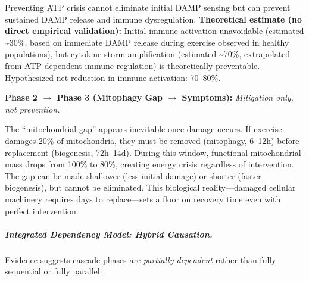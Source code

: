 Preventing ATP crisis cannot eliminate initial DAMP sensing but can prevent sustained DAMP release and immune dysregulation. \textbf{Theoretical estimate (no direct empirical validation):} Initial immune activation unavoidable (estimated \textasciitilde30\%, based on immediate DAMP release during exercise observed in healthy populations), but cytokine storm amplification (estimated \textasciitilde70\%, extrapolated from ATP-dependent immune regulation) is theoretically preventable. Hypothesized net reduction in immune activation: 70--80\%.

\textbf{Phase 2 $\rightarrow$ Phase 3 (Mitophagy Gap $\rightarrow$ Symptoms):} \textit{Mitigation only, not prevention.}

The ``mitochondrial gap'' appears inevitable once damage occurs. If exercise damages 20\% of mitochondria, they must be removed (mitophagy, 6--12h) before replacement (biogenesis, 72h--14d). During this window, functional mitochondrial mass drops from 100\% to 80\%, creating energy crisis regardless of intervention. The gap can be made shallower (less initial damage) or shorter (faster biogenesis), but cannot be eliminated. This biological reality---damaged cellular machinery requires days to replace---sets a floor on recovery time even with perfect intervention.

\subparagraph{Integrated Dependency Model: Hybrid Causation.}

Evidence suggests cascade phases are \textit{partially dependent} rather than fully sequential or fully parallel:

